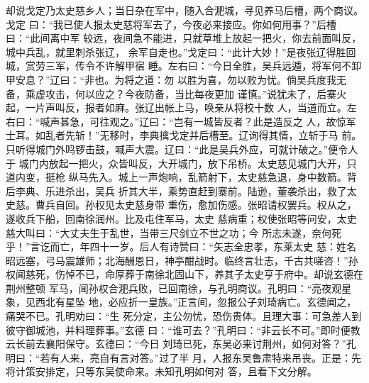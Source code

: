 却说戈定乃太史慈乡人；当日杂在军中，随入合淝城，寻见养马后槽，两个商议。戈定
曰：“我已使人报太史慈将军去了，今夜必来接应。你如何用事？”后槽曰：“此间离中军
较远，夜间急不能进，只就草堆上放起一把火，你去前面叫反，城中兵乱，就里刺杀张辽，
余军自走也。”戈定曰：“此计大妙！”是夜张辽得胜回城，赏劳三军，传令不许解甲宿
睡。左右曰：“今日全胜，吴兵远遁，将军何不卸甲安息？”辽曰：“非也。为将之道：勿
以胜为喜，勿以败为忧。倘吴兵度我无备，乘虚攻击，何以应之？今夜防备，当比每夜更加
谨慎。”说犹未了，后寨火起，一片声叫反，报者如麻。张辽出帐上马，唤亲从将校十数
人，当道而立。左右曰：“喊声甚急，可往观之。”辽曰：“岂有一城皆反者？此是造反之
人，故惊军士耳。如乱者先斩！”无移时，李典擒戈定并后槽至。辽询得其情，立斩于马
前。只听得城门外鸣锣击鼓，喊声大震。辽曰：“此是吴兵外应，可就计破之。”便令人于
城门内放起一把火，众皆叫反，大开城门，放下吊桥。太史慈见城门大开，只道内变，挺枪
纵马先入。城上一声炮响，乱箭射下，太史慈急退，身中数箭。背后李典、乐进杀出，吴兵
折其大半，乘势直赶到寨前。陆逊，董袭杀出，救了太史慈。曹兵自回。孙权见太史慈身带
重伤，愈加伤感。张昭请权罢兵。权从之，遂收兵下船，回南徐润州。比及屯住军马，太史
慈病重；权使张昭等问安，太史慈大叫曰：“大丈夫生于乱世，当带三尺剑立不世之功；今
所志未遂，奈何死乎！”言讫而亡，年四十一岁。后人有诗赞曰：“矢志全忠孝，东莱太史
慈：姓名昭远塞，弓马震雄师；北海酬恩日，神亭酣战时。临终言壮志，千古共嗟咨！”孙
权闻慈死，伤悼不已，命厚葬于南徐北固山下，养其子太史亨于府中。却说玄德在荆州整顿
军马，闻孙权合淝兵败，已回南徐，与孔明商议。孔明曰：“亮夜观星象，见西北有星坠
地，必应折一皇族。”正言间，忽报公子刘琦病亡。玄德闻之，痛哭不已。孔明劝曰：“生
死分定，主公勿忧，恐伤贵体。且理大事：可急差人到彼守御城池，并料理葬事。”玄德
曰：“谁可去？”孔明曰：“非云长不可。”即时便教云长前去襄阳保守。玄德曰：“今日
刘琦已死，东吴必来讨荆州，如何对答？”孔明曰：“若有人来，亮自有言对答。”过了半
月，人报东吴鲁肃特来吊丧。正是：先将计策安排定，只等东吴使命来。未知孔明如何对
答，且看下文分解。